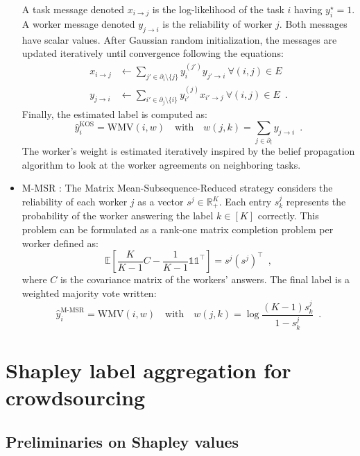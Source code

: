 \documentclass{cap2024}
\begin{document}
\begin{itemize}
  A task message denoted $x_{i\rightarrow j}$ is the log-likelihood of the task $i$ having $y_i^\star=1$.
  A worker message denoted $y_{j\rightarrow i}$ is the reliability of worker $j$.
  Both messages have scalar values.
  After Gaussian random initialization, the messages are updated iteratively until convergence following the equations:
  \begin{align*}
      x_{i\rightarrow j} &\gets \sum_{j'\in \partial_i\setminus \{j\}} y_i^{(j')}y_{j'\rightarrow i} \ \forall (i,j)\in E \\
      y_{j\rightarrow i} &\gets \sum_{i'\in \partial_j\setminus \{i\}} y_{i'}^{(j)} x_{i'\rightarrow j} \ \forall (i,j)\in E\enspace.
  \end{align*}
  Finally, the estimated label is computed as:
  \begin{equation}
    \hat y_i^{\text{KOS}} = \mathrm{WMV}(i, w)\quad \text{with}\quad w(j,k)=\sum_{j\in\partial_i}y_{j\rightarrow i}\enspace.
  \end{equation}
  The worker's weight is estimated iteratively inspired by the belief propagation algorithm to look at the worker agreements on neighboring tasks.
  \item M-MSR \citep{ma2020adversarial}: The Matrix Mean-Subsequence-Reduced strategy considers the reliability of each worker $j$ as a vector $s^j\in\mathbb{R}^K_+$. Each entry $s^j_k$ represents the probability of the worker answering the label $k\in[K]$ correctly.
  This problem can be formulated as a rank-one matrix completion problem per worker defined as:
  \[\mathbb{E}\left[\frac{K}{K-1}C - \frac{1}{K-1}\mathds{1}\mathds{1}^\top\right]=s^j(s^j)^\top \enspace,\]
  where $C$ is the covariance matrix of the workers' answers.
  The final label is a weighted majority vote written:
  \begin{equation}
    \hat y_i^{\text{M-MSR}} = \mathrm{WMV}(i, w)\quad \text{with}\quad w(j,k)=\log\frac{(K-1)s^j_k}{1-s^j_k}\enspace.
  \end{equation}
\end{itemize}

\section{Shapley label aggregation for crowdsourcing}
\label{sec:shapagg}

\subsection{Preliminaries on Shapley values}
\end{document}
